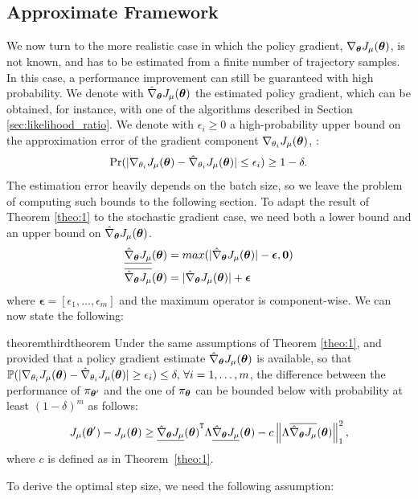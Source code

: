 \subsection{Approximate Framework}\label{sec:approx}
We now turn to the more realistic case in which the policy gradient, $\gradJ{\vtheta}$, is not known, and has to be estimated from a finite number of trajectory samples. In this case, a performance improvement can still be guaranteed with high probability. 
We denote with $\gradApp{\vtheta}$ the estimated policy gradient, which can be obtained, for instance, with one of the algorithms described in Section \ref{sec:likelihood_ratio}.
We denote with $\epsilon_i \geq 0$ a high-probability upper bound on the approximation error of the gradient component $\gradJ{\theta_i}$, \ie:
\[
	\Pr(|\gradJ{\theta_i} - \gradApp{\theta_i}| \leq \epsilon_i) \geq 1-\delta.
\]
The estimation error heavily depends on the batch size, so we leave the problem of computing such bounds to the following section.
To adapt the result of Theorem \ref{theo:1} to the stochastic gradient case, we need both a lower bound and an upper bound on $\gradApp{\vtheta}$.
\begin{align*}
\gradDown{\vtheta} &= max(|\gradApp{\vtheta}| - \boldsymbol{\epsilon},\boldsymbol{0}) \\
\gradUp{\vtheta} &= |\gradApp{\vtheta}| + \boldsymbol{\epsilon}
\end{align*}
where $\boldsymbol{\epsilon}=[\epsilon_1,\dotsc,\epsilon_m]$ and the maximum operator is component-wise.
We can now state the following: 

\begin{restatable}{theorem}{thirdtheorem}\label{theo:3}
Under the same assumptions of Theorem \ref{theo:1}, and provided that a policy gradient estimate $\gradApp{\vtheta}$ is available, so that $\mathbb{P}(|\gradJ{\theta_i}-\gradApp{\theta_i}| \geq \epsilon_i) \leq \delta, \, \forall i=1,\dotsc,m$, the difference between the performance of $\pi_{\vtheta'}$ and the one of $\pi_ {\vtheta}$ can be bounded below with probability at least $(1-\delta)^m$ as follows:
\[
\DeltaJ \geq \transpose{\gradDown{\vtheta}}\Lambda\gradDown{\vtheta} - 				 c\norm[1]{\Lambda\gradUp{\vtheta}}^2,
\]
where $c$ is defined as in Theorem~\ref{theo:1}.
\end{restatable}

To derive the optimal step size, we need the following assumption:

